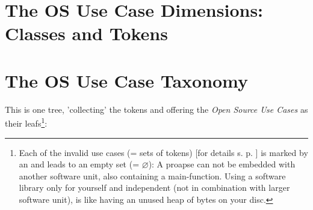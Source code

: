 %
%
%
%
%




\section{The OS Use Case Dimensions: Classes and Tokens}


\begin{footnotesize}


\end{footnotesize}  
  

\section{The OS Use Case Taxonomy}

This is one tree, 'collecting' the tokens and offering the \emph{Open Source Use
Cases} as their leafs\footnote{ Each of the invalid use cases (= sets of tokens)
[for details s. p. \pageref{InvalidFinderTokenCombinations}] is marked by an
\lightning{} and leads to an empty set (= $\varnothing$): A proapse can not be
embedded with another software unit, also containing a main-function. Using
a software library only for yourself and independent (not in combination with larger
software unit), is like having an unused heap of bytes on your disc.}:

